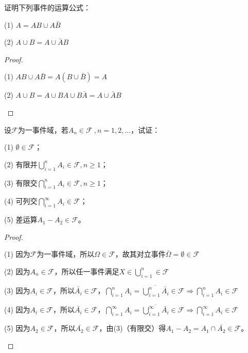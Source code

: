 \documentclass[lang=cn,newtx,10pt,scheme=chinese]{elegantbook}
\begin{document}
\begin{problemset}[习题 1.1]
    \item 证明下列事件的运算公式：
    \item[(1)] $A=AB \cup A\bar{B}$
    \item[(2)] $A \cup B = A \cup \bar{A}B$
    \begin{proof}
        \begin{framed}
            \item[(1)] $AB \cup A\bar{B}=A(B \cup \bar{B}) = A$
            \item[(2)] $A \cup B=A\cup BA \cup B\bar{A} = A \cup \bar{A}B$
        \end{framed}
    \end{proof}

    \item 设$\mathscr{F}$为一事件域，若$A_n \in \mathscr{F}\ , n=1,2,...$，试证：
    \item[(1)] $\emptyset \in \mathscr{F}$；
    \item[(2)] 有限并$\bigcup\limits_{i=1}^{n}{A_i} \in \mathscr{F}, n \geq 1$；
    \item[(3)] 有限交$\bigcap\limits_{i=1}^{n}{A_i} \in \mathscr{F}, n \geq 1$；
    \item[(4)] 可列交$\bigcap\limits_{i=1}^{\infty}{A_i} \in \mathscr{F}$；
    \item[(5)] 差运算$A_1 - A_2 \in \mathscr{F}$。
    \begin{proof}
        \begin{framed}
            \item[(1)] 因为$\mathscr{F}$为一事件域，所以$\Omega \in \mathscr{F}$，故其对立事件$\bar{\Omega}=\emptyset \in \mathscr{F}$
            \item[(2)] 因为$A_n \in \mathscr{F}$，所以任一事件满足$X \in \bigcup\limits_{i=1}^{n} \in \mathscr{F}$
            \item[(3)] 因为$A_i \in \mathscr{F}$，所以$\bar{A_i} \in \mathscr{F}$，$\bigcap\limits_{i=1}^{n}A_i = \overline{\bigcup\limits_{i=1}^n{\bar{A_i}}} \in \mathscr{F} \Rightarrow \bigcap\limits_{i=1}^{n}{A_i} \in \mathscr{F}$
            \item[(4)] 因为$A_i \in \mathscr{F}$，所以$\bar{A_i} \in \mathscr{F}$，$\bigcap\limits_{i=1}^{\infty}A_i = \overline{\bigcup\limits_{i=1}^\infty{\bar{A_i}}} \in \mathscr{F} \Rightarrow \bigcap\limits_{i=1}^{\infty}{A_i} \in \mathscr{F}$
            \item[(5)] 因为$A_2 \in \mathscr{F}$，所以$\bar{A_2} \in \mathscr{F}$，由(3)（有限交）得$A_1-A_2=A_1 \cap \bar{A_2} \in \mathscr{F}$。
        \end{framed}
    \end{proof}
\end{problemset}
\newpage
\end{document}
